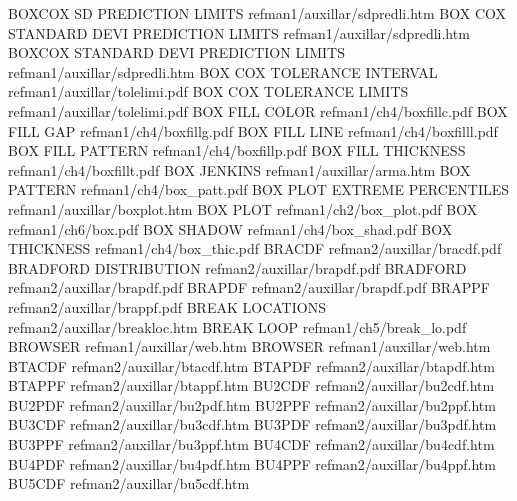 BOXCOX SD PREDICTION LIMITS             refman1/auxillar/sdpredli.htm
BOX COX STANDARD DEVI PREDICTION LIMITS refman1/auxillar/sdpredli.htm
BOXCOX STANDARD DEVI PREDICTION LIMITS  refman1/auxillar/sdpredli.htm
BOX COX TOLERANCE INTERVAL              refman1/auxillar/tolelimi.pdf
BOX COX TOLERANCE LIMITS                refman1/auxillar/tolelimi.pdf
BOX FILL COLOR                          refman1/ch4/boxfillc.pdf
BOX FILL GAP                            refman1/ch4/boxfillg.pdf
BOX FILL LINE                           refman1/ch4/boxfilll.pdf
BOX FILL PATTERN                        refman1/ch4/boxfillp.pdf
BOX FILL THICKNESS                      refman1/ch4/boxfillt.pdf
BOX JENKINS                             refman1/auxillar/arma.htm
BOX PATTERN                             refman1/ch4/box_patt.pdf
BOX PLOT EXTREME PERCENTILES            refman1/auxillar/boxplot.htm
BOX PLOT                                refman1/ch2/box_plot.pdf
BOX                                     refman1/ch6/box.pdf
BOX SHADOW                              refman1/ch4/box_shad.pdf
BOX THICKNESS                           refman1/ch4/box_thic.pdf
BRACDF                                  refman2/auxillar/bracdf.pdf
BRADFORD DISTRIBUTION                   refman2/auxillar/brapdf.pdf
BRADFORD                                refman2/auxillar/brapdf.pdf
BRAPDF                                  refman2/auxillar/brapdf.pdf
BRAPPF                                  refman2/auxillar/brappf.pdf
BREAK LOCATIONS                         refman2/auxillar/breakloc.htm
BREAK LOOP                              refman1/ch5/break_lo.pdf
BROWSER                                 refman1/auxillar/web.htm
BROWSER                                 refman1/auxillar/web.htm
BTACDF                                  refman2/auxillar/btacdf.htm
BTAPDF                                  refman2/auxillar/btapdf.htm
BTAPPF                                  refman2/auxillar/btappf.htm
BU2CDF                                  refman2/auxillar/bu2cdf.htm
BU2PDF                                  refman2/auxillar/bu2pdf.htm
BU2PPF                                  refman2/auxillar/bu2ppf.htm
BU3CDF                                  refman2/auxillar/bu3cdf.htm
BU3PDF                                  refman2/auxillar/bu3pdf.htm
BU3PPF                                  refman2/auxillar/bu3ppf.htm
BU4CDF                                  refman2/auxillar/bu4cdf.htm
BU4PDF                                  refman2/auxillar/bu4pdf.htm
BU4PPF                                  refman2/auxillar/bu4ppf.htm
BU5CDF                                  refman2/auxillar/bu5cdf.htm
